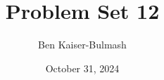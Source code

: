 \documentclass{article}
\title{Problem Set 12}
\author{Ben Kaiser-Bulmash}
\date{October 31, 2024}
\newcommand{\1}{\mathbb{1}}
\begin{document}
\maketitle

\section*{}
\end{document}
